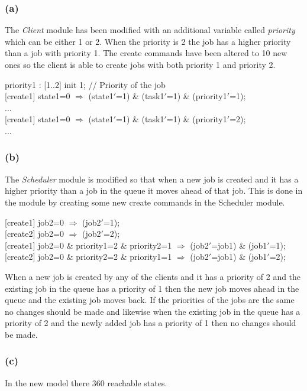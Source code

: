 \documentclass[12pt]{report}
\begin{document}
\subsubsection*{(a)}
The \emph{Client} module has been modified with an additional variable called \emph{priority} which can be either 1 or 2. When the priority is 2 the job has a higher priority than a job with priority 1. The create commands have been altered to 10 new ones so the client is able to create jobs with both priority 1 and priority 2.
\begin{center}
priority1 : [1..2] init 1; // Priority of the job\\
{[create1]} state1=0 $\Rightarrow$ (state1$'$=1) \& (task1$'$=1) \& (priority1$'$=1);\\
$\dots$\\
{[create1]} state1=0 $\Rightarrow$ (state1$'$=1) \& (task1$'$=1) \& (priority1$'$=2);\\
$\dots$
\end{center}
\subsubsection*{(b)}
The \emph{Scheduler} module is modified so that when a new job is created and it has a higher priority than a job in the queue it moves ahead of that job. This is done in the module by creating some new create commands in the Scheduler module.
\begin{center}
{[create1]} job2=0 $\Rightarrow$ (job2$'$=1);\\
{[create2]} job2=0 $\Rightarrow$ (job2$'$=2);\\
{[create1]} job2=0 \& priority1=2 \& priority2=1 $\Rightarrow$ (job2$'$=job1) \& (job1$'$=1);\\
{[create2]} job2=0 \& priority2=2 \& priority1=1 $\Rightarrow$ (job2$'$=job1) \& (job1$'$=2);
\end{center}
When a new job is created by any of the clients and it has a priority of 2 and the existing job in the queue has a priority of 1 then the new job moves ahead in the queue and the existing job moves back. If the priorities of the jobs are the same no changes should be made and likewise when the existing job in the queue has a priority of 2 and the newly added job has a priority of 1 then no changes should be made.
\subsubsection*{(c)}
In the new model there 360 reachable states.
\end{document}

